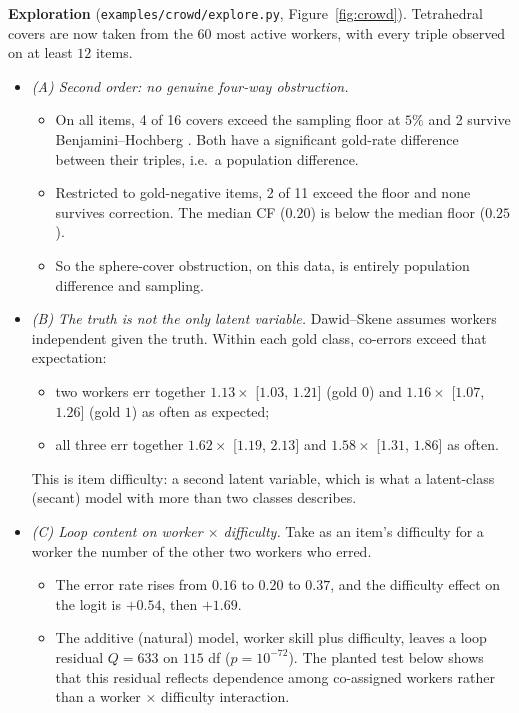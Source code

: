 \documentclass[11pt]{article}
\theoremstyle{definition}
\theoremstyle{remark}
\begin{document}
\textbf{Exploration} (\texttt{examples/crowd/explore.py}, Figure~\ref{fig:crowd}). Tetrahedral covers are now taken from the 60 most active workers, with every triple observed on at least $12$ items.
\begin{itemize}
  \item \emph{(A) Second order: no genuine four-way obstruction.}
  \begin{itemize}
    \item On all items, 4 of 16 covers exceed the sampling floor at $5\%$ and 2 survive Benjamini--Hochberg \cite{bh95}. Both have a significant gold-rate difference between their triples, i.e.\ a population difference.
    \item Restricted to gold-negative items, 2 of 11 exceed the floor and none survives correction. The median CF ($0.20$) is below the median floor ($0.25$).
    \item So the sphere-cover obstruction, on this data, is entirely population difference and sampling.
  \end{itemize}
  \item \emph{(B) The truth is not the only latent variable.} Dawid--Skene \cite{dawidskene79} assumes workers independent given the truth. Within each gold class, co-errors exceed that expectation:
  \begin{itemize}
    \item two workers err together $1.13\times$ [$1.03$, $1.21$] (gold $0$) and $1.16\times$ [$1.07$, $1.26$] (gold $1$) as often as expected;
    \item all three err together $1.62\times$ [$1.19$, $2.13$] and $1.58\times$ [$1.31$, $1.86$] as often.
  \end{itemize}
  This is item difficulty: a second latent variable, which is what a latent-class (secant) model with more than two classes describes.
  \item \emph{(C) Loop content on worker $\times$ difficulty.} Take as an item's difficulty for a worker the number of the other two workers who erred.
  \begin{itemize}
    \item The error rate rises from $0.16$ to $0.20$ to $0.37$, and the difficulty effect on the logit is $+0.54$, then $+1.69$.
    \item The additive (natural) model, worker skill plus difficulty, leaves a loop residual $Q=633$ on $115$ df ($p=10^{-72}$). The planted test below shows that this residual reflects dependence among co-assigned workers rather than a worker $\times$ difficulty interaction.

\end{itemize}
\end{itemize}
\end{document}
